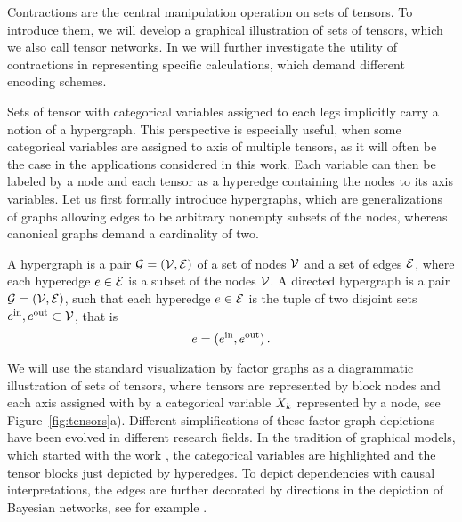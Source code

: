 \sect{\bncontractions}

Contractions are the central manipulation operation on sets of tensors.
To introduce them, we will develop a graphical illustration of sets of tensors, which we also call tensor networks.
In  we will further investigate the utility of contractions in representing specific calculations, which demand different encoding schemes.



Sets of tensor with categorical variables assigned to each legs implicitly carry a notion of a hypergraph.
This perspective is especially useful, when some categorical variables are assigned to axis of multiple tensors, as it will often be the case in the applications considered in this work.
Each variable can then be labeled by a node and each tensor as a hyperedge containing the nodes to its axis variables.
Let us first formally introduce hypergraphs, which are generalizations of graphs allowing edges to be arbitrary nonempty subsets of the nodes, whereas canonical graphs demand a cardinality of two.

\begin{definition}\label{def:hypergraphs}
	A hypergraph is a pair $\mathcal{G}=(\mathcal{V},\mathcal{E})$ of a set of nodes $\mathcal{V}$ and a set of edges $\mathcal{E}$, where each hyperedge $e\in\mathcal{E}$ is a subset of the nodes $\mathcal{V}$.
	A directed hypergraph is a pair $\mathcal{G}=(\mathcal{V},\mathcal{E})$, such that each hyperedge $e\in\mathcal{E}$ is the tuple of two disjoint sets $e^{\mathrm{in}},e^{\mathrm{out}}\subset\mathcal{V}$, that is
		\[ e = (e^{\mathrm{in}},e^{\mathrm{out}})  \, . \]
\end{definition}

We will use the standard visualization by factor graphs as a diagrammatic illustration of sets of tensors, where tensors are represented by block nodes and each axis assigned with by a categorical variable $X_{k}$ represented by a node, see Figure~\ref{fig:tensors}a).
Different simplifications of these factor graph depictions have been evolved in different research fields.
In the tradition of graphical models, which started with the work \cite{pearl_probabilistic_1988}, the categorical variables are highlighted and the tensor blocks just depicted by hyperedges.
To depict dependencies with causal interpretations, the edges are further decorated by directions in the depiction of Bayesian networks, see for example \cite{pearl_causality_2009}.

